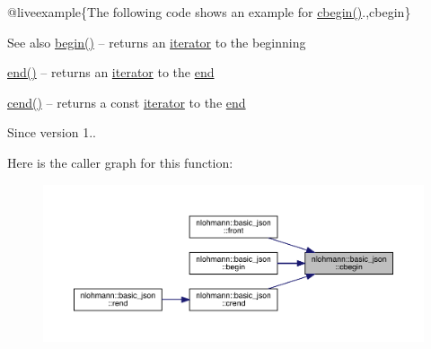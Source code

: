 @liveexample\{The following code shows an example for {\ttfamily \mbox{\hyperlink{classnlohmann_1_1basic__json_ad865d6c291b237ae508d5cb2146b5877}{cbegin()}}}.,cbegin\}

\begin{DoxySeeAlso}{See also}
\mbox{\hyperlink{classnlohmann_1_1basic__json_a0ff28dac23f2bdecee9564d07f51dcdc}{begin()}} -- returns an \mbox{\hyperlink{classnlohmann_1_1basic__json_a099316232c76c034030a38faa6e34dca}{iterator}} to the beginning 

\mbox{\hyperlink{classnlohmann_1_1basic__json_a13e032a02a7fd8a93fdddc2fcbc4763c}{end()}} -- returns an \mbox{\hyperlink{classnlohmann_1_1basic__json_a099316232c76c034030a38faa6e34dca}{iterator}} to the \mbox{\hyperlink{classnlohmann_1_1basic__json_a13e032a02a7fd8a93fdddc2fcbc4763c}{end}} 

\mbox{\hyperlink{classnlohmann_1_1basic__json_a8dba7b7d2f38e6b0c614030aa43983f6}{cend()}} -- returns a const \mbox{\hyperlink{classnlohmann_1_1basic__json_a099316232c76c034030a38faa6e34dca}{iterator}} to the \mbox{\hyperlink{classnlohmann_1_1basic__json_a13e032a02a7fd8a93fdddc2fcbc4763c}{end}}
\end{DoxySeeAlso}
\begin{DoxySince}{Since}
version 1.. 
\end{DoxySince}
Here is the caller graph for this function\+:\nopagebreak
\begin{figure}[H]
\begin{center}
\leavevmode
\includegraphics[width=350pt]{classnlohmann_1_1basic__json_ad865d6c291b237ae508d5cb2146b5877_icgraph}
\end{center}
\end{figure}
\mbox{\label{classnlohmann_1_1basic__json_a8dba7b7d2f38e6b0c614030aa43983f6}} 
